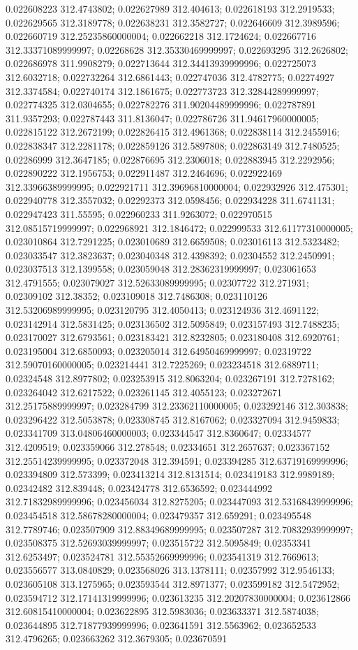 0.022608223 312.4743802; 0.022627989 312.404613; 0.022618193 312.2919533; 0.022629565 312.3189778; 0.022638231 312.3582727; 0.022646609 312.3989596; 0.022660719 312.25235860000004; 0.022662218 312.1724624; 0.022667716 312.33371089999997; 0.02268628 312.35330469999997; 0.022693295 312.2626802; 0.022686978 311.9908279; 0.022713644 312.34413939999996; 0.022725073 312.6032718; 0.022732264 312.6861443; 0.022747036 312.4782775; 0.02274927 312.3374584; 0.022740174 312.1861675; 0.022773723 312.32844289999997; 0.022774325 312.0304655; 0.022782276 311.90204489999996; 0.022787891 311.9357293; 0.022787443 311.8136047; 0.022786726 311.94617960000005; 0.022815122 312.2672199; 0.022826415 312.4961368; 0.022838114 312.2455916; 0.022838347 312.2281178; 0.022859126 312.5897808; 0.022863149 312.7480525; 0.02286999 312.3647185; 0.022876695 312.2306018; 0.022883945 312.2292956; 0.022890222 312.1956753; 0.022911487 312.2464696; 0.022922469 312.33966389999995; 0.022921711 312.39696810000004; 0.022932926 312.475301; 0.022940778 312.3557032; 0.02292373 312.0598456; 0.022934228 311.6741131; 0.022947423 311.55595; 0.022960233 311.9263072; 0.022970515 312.08515719999997; 0.022968921 312.1846472; 0.022999533 312.61177310000005; 0.023010864 312.7291225; 0.023010689 312.6659508; 0.023016113 312.5323482; 0.023033547 312.3823637; 0.023040348 312.4398392; 0.02304552 312.2450991; 0.023037513 312.1399558; 0.023059048 312.28362319999997; 0.023061653 312.4791555; 0.023079027 312.52633089999995; 0.02307722 312.271931; 0.02309102 312.38352; 0.023109018 312.7486308; 0.023110126 312.53206989999995; 0.023120795 312.4050413; 0.023124936 312.4691122; 0.023142914 312.5831425; 0.023136502 312.5095849; 0.023157493 312.7488235; 0.023170027 312.6793561; 0.023183421 312.8232805; 0.023180408 312.6920761; 0.023195004 312.6850093; 0.023205014 312.64950469999997; 0.02319722 312.59070160000005; 0.023214441 312.7225269; 0.023234518 312.6889711; 0.02324548 312.8977802; 0.023253915 312.8063204; 0.023267191 312.7278162; 0.023264042 312.6217522; 0.023261145 312.4055123; 0.023272671 312.25175889999997; 0.023284799 312.23362110000005; 0.023292146 312.303838; 0.023296422 312.5053878; 0.023308745 312.8167062; 0.023327094 312.9459833; 0.023341709 313.04806460000003; 0.023344547 312.8360647; 0.02334577 312.4209519; 0.023359066 312.278548; 0.02334651 312.2657637; 0.023367152 312.25514239999995; 0.023372048 312.394591; 0.023394285 312.63719169999996; 0.023394809 312.573399; 0.023413214 312.8131514; 0.023419183 312.9989189; 0.02342482 312.839448; 0.023424778 312.6536592; 0.023444992 312.71832989999996; 0.023456034 312.8275205; 0.023447093 312.53168439999996; 0.023454518 312.58678280000004; 0.023479357 312.659291; 0.023495548 312.7789746; 0.023507909 312.88349689999995; 0.023507287 312.70832939999997; 0.023508375 312.52693039999997; 0.023515722 312.5095849; 0.02353341 312.6253497; 0.023524781 312.55352669999996; 0.023541319 312.7669613; 0.023556577 313.0840829; 0.023568026 313.1378111; 0.02357992 312.9546133; 0.023605108 313.1275965; 0.023593544 312.8971377; 0.023599182 312.5472952; 0.023594712 312.17141319999996; 0.023613235 312.20207830000004; 0.023612866 312.60815410000004; 0.023622895 312.5983036; 0.023633371 312.5874038; 0.023644895 312.71877939999996; 0.023641591 312.5563962; 0.023652533 312.4796265; 0.023663262 312.3679305; 0.023670591 